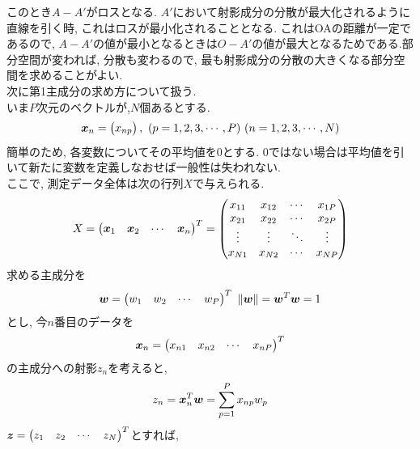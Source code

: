 \documentclass[dvipdfmx,a4j]{jsarticle}
\begin{document}
このとき$A-A'$がロスとなる. $A'$において射影成分の分散が最大化されるように直線を引く時, これはロスが最小化されることとなる. これはOAの距離が一定であるので, $A-A'$の値が最小となるときは$O-A'$の値が最大となるためである.部分空間が変われば, 分散も変わるので, 最も射影成分の分散の大きくなる部分空間を求めることがよい. \\
次に第1主成分の求め方について扱う.\\
いま$P$次元のベクトルが,$N$個あるとする.
\begin{eqnarray*}
    \mbox{\boldmath $x$}_{n}=\begin{pmatrix}x_{np}\end{pmatrix},\ (p=1,2,3,\cdots,P)\ (n=1,2,3,\cdots,N)
\end{eqnarray*}
簡単のため, 各変数についてその平均値を0とする. 0ではない場合は平均値を引いて新たに変数を定義しなおせば一般性は失われない.\\
ここで, 測定データ全体は次の行列$X$で与えられる.
\begin{eqnarray*}
    X=\begin{pmatrix} \mbox{\boldmath $x$}_{1}&\mbox{\boldmath $x$}_{2}&\cdots&\mbox{\boldmath $x$}_{n}\end{pmatrix}^{T}=\begin{pmatrix} x_{11}&x_{12}&\cdots&x_{1P}\\ x_{21}&x_{22}&\cdots&x_{2P}\\\vdots&\vdots&\ddots&\vdots \\ x_{N1}&x_{N2}&\cdots&x_{NP} \end{pmatrix}
\end{eqnarray*}
求める主成分を
\begin{eqnarray*}
    \mbox{\boldmath $w$} = \begin{pmatrix}w_{1}&w_{2}&\cdots&w_{P}\end{pmatrix}^{T}\ \|\mbox{\boldmath $w$}\|=\mbox{\boldmath $w$}^{T}\mbox{\boldmath $w$}=1
\end{eqnarray*}
とし, 今$n$番目のデータを
\begin{eqnarray*}
    \mbox{\boldmath $x$}_{n}=\begin{pmatrix} x_{n1}&x_{n2}&\cdots&x_{nP}\end{pmatrix}^{T}
\end{eqnarray*}
の主成分への射影$z_{n}$を考えると,
\begin{eqnarray*}
    z_{n}=\mbox{\boldmath $x$}_{n}^{T}\mbox{\boldmath $w$}=\sum_{p=1}^{P}x_{np}w_{p}
\end{eqnarray*}
$\mbox{\boldmath $z$}=\begin{pmatrix}z_{1}&z_{2}&\cdots &z_{N}\end{pmatrix}^{T}$とすれば,
\end{document}
